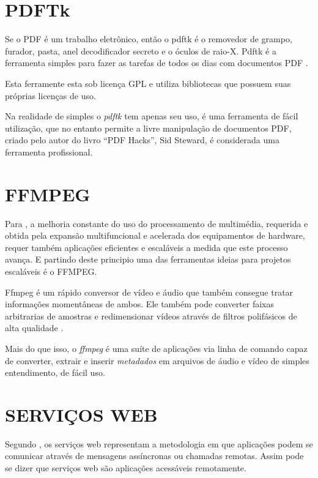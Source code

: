 \section{PDFTk}

Se o PDF é um trabalho eletrônico, então o pdftk é o removedor de grampo, furador, pasta, anel decodificador secreto e o óculos de raio-X. Pdftk é a ferramenta simples para fazer as tarefas de todos os dias com documentos PDF \cite{STEWARD}.

Esta ferramente esta sob licença GPL e utiliza bibliotecas que possuem suas próprias licenças de uso.

Na realidade de simples o \textit{pdftk} tem apenas seu uso, é uma ferramenta de fácil utilização, que no entanto permite a livre manipulação de documentos PDF, criado pelo autor do livro “PDF Hacks”, Sid Steward, é considerada uma ferramenta profissional.

\section{FFMPEG}

Para \cite{FFMPEG-SCALABLE}, a melhoria constante do uso do processamento de multimédia, requerida e obtida pela expansão multifuncional e acelerada dos equipamentos de hardware, requer também aplicações eficientes e escaláveis a medida que este processo avança. E partindo deste principio uma das ferramentas ideias para projetos escaláveis é o FFMPEG.

Ffmpeg é um rápido conversor de vídeo e áudio que também consegue tratar informações momentâneas de ambos. Ele também pode converter faixas arbitrarias de amostras e redimensionar vídeos através de filtros polifásicos de alta qualidade \cite{FFMPEG}.

Mais do que isso, o \textit{ffmpeg} é uma suíte de aplicações via linha de comando capaz de converter, extrair e inserir \textit{metadados} em arquivos de áudio e vídeo de simples entendimento, de fácil uso.

\section{SERVIÇOS WEB}

Segundo \cite{Pirnau-Apetrei-Badea}, os serviços web representam a metodologia em que aplicações podem se comunicar através de mensagens assíncronas ou chamadas remotas. Assim pode se dizer que serviços web são aplicações acessáveis remotamente.

